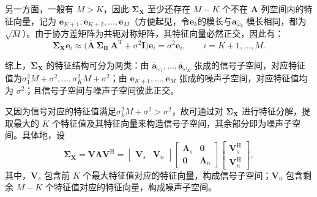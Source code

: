 另一方面，一般有 \(M > K\)，因此 \(\mathbf{\Sigma}_{\mathbf{X}}\) 至少还存在 \(M-K\) 个不在 \(\mathbf{A}\) 列空间内的特征向量，记为 \(\bm{e}_{K+1},\bm{e}_{K+2},\dots,\bm{e}_M\)（方便起见，令\( \bm{e}_k \)的模长与\( \bm{a}_{\omega_k}\) 模长相同，都为\( \sqrt{M} \)）。由于协方差矩阵为共轭对称矩阵，其特征向量必然正交，因此有：
\[
    \mathbf{\Sigma}_{\mathbf{X}} \bm{e}_i
    \approx \big(\overline{\mathbf{A}}\,\mathbf{\Sigma}_{\mathbf{R}}\,\mathbf{A}^{\mathrm{T}} + \sigma^2 \mathbf{I}\big)\bm{e}_i
    = \sigma^2 \bm{e}_i,\qquad i=K+1,\dots,M.
\]

综上，\(\mathbf{\Sigma}_{\mathbf{X}}\) 的特征结构可分为两类：由 \(\overline{\bm{a}}_{\omega_1},\dots,\overline{\bm{a}}_{\omega_K}\) 张成的信号子空间，对应特征值为\(\sigma_1^2 M+\sigma^2,\dots,\sigma_K^2 M+\sigma^2\)；由 \(\bm{e}_{K+1},\dots,\bm{e}_M\) 张成的噪声子空间，对应特征值均为 \(\sigma^2\)；且信号子空间与噪声子空间彼此正交。

又因为信号对应的特征值满足\(\sigma_k^2 M + \sigma^2 > \sigma^2\)，故可通过对 \(\mathbf{\Sigma}_{\mathbf{X}}\) 进行特征分解，提取最大的 \(K\) 个特征值及其特征向量来构造信号子空间，其余部分即为噪声子空间。具体地，设
\[
    \mathbf{\Sigma}_{\mathbf{X}}
    = \mathbf{V}\mathbf{\Lambda}\mathbf{V}^{\mathrm{H}}
    = \begin{bmatrix}
        \mathbf{V}_{s} & \mathbf{V}_{n}
    \end{bmatrix}
    \begin{bmatrix}
        \mathbf{\Lambda}_{s} & \mathbf{0}           \\
        \mathbf{0}           & \mathbf{\Lambda}_{n}
    \end{bmatrix}
    \begin{bmatrix}
        \mathbf{V}_{s}^{\mathrm{H}} \\
        \mathbf{V}_{n}^{\mathrm{H}}
    \end{bmatrix},
\]
其中，\(\mathbf{V}_{s}\) 包含前 \(K\) 个最大特征值对应的特征向量，构成信号子空间；\(\mathbf{V}_{n}\) 包含剩余 \(M-K\) 个特征值对应的特征向量，构成噪声子空间。

